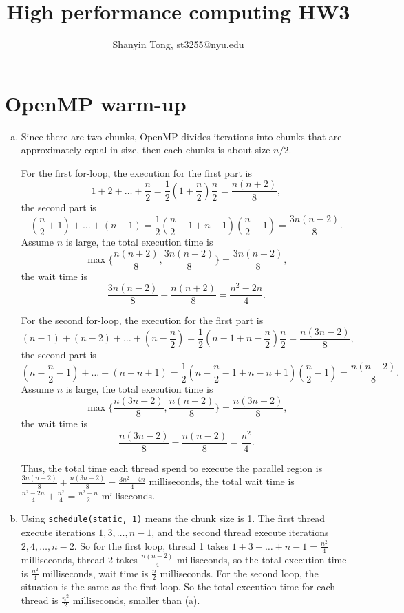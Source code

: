\documentclass[10pt,a4paper]{article}
\theoremstyle{dotlessP}
\begin{document}
\title{High performance computing HW3}
\author{Shanyin Tong, st3255@nyu.edu}

\maketitle

\section{OpenMP warm-up}
\begin{enumerate}[(a)]
	\item Since there are two chunks,  OpenMP divides iterations into chunks that are approximately equal in size, then each chunks is about size $n/2$. 
	
	For the first for-loop,  the execution for the first part is $$1+2+\ldots+\frac{n}{2}=\frac{1}{2}(1+\frac{n}{2})\frac{n}{2}=\frac{n(n+2)}{8},$$ the second part is 
	$$ (\frac{n}{2}+1) + \ldots + (n-1) = \frac{1}{2}( \frac{n}{2}+1+n-1)(\frac{n}{2}-1)=\frac{3n(n-2)}{8}.$$ Assume $n$ is large, the total execution time is 
	$$\max\{\frac{n(n+2)}{8}, \frac{3n(n-2)}{8}\}=  \frac{3n(n-2)}{8},$$ the wait time is $$\frac{3n(n-2)}{8} - \frac{n(n+2)}{8} = \frac{n^2-2n}{4} .$$
	
	For the second for-loop, the execution for the first part is $$(n-1)+(n-2)+\ldots+(n-\frac{n}{2})=\frac{1}{2}(n-1+n-\frac{n}{2})\frac{n}{2}=\frac{n(3n-2)}{8},$$ the second part is 
	$$ (n-\frac{n}{2}-1 )+ \ldots +(n- n+1) = \frac{1}{2}( n-\frac{n}{2}-1+n-n+1)(\frac{n}{2}-1)=\frac{n(n-2)}{8}.$$ Assume $n$ is large, the total execution time is 
	$$\max\{\frac{n(3n-2)}{8}, \frac{n(n-2)}{8}\}=  \frac{n(3n-2)}{8},$$ the wait time is $$\frac{n(3n-2)}{8} - \frac{n(n-2)}{8} = \frac{n^2}{4} .$$
	
	Thus, the total time each thread spend to execute the parallel region is $\frac{3n(n-2)}{8}+\frac{n(3n-2)}{8}=\frac{3n^2-4n}{4}$ milliseconds, the total wait time is $\frac{n^2-2n}{4}+\frac{n^2}{4}=\frac{n^2-n}{2}$ milliseconds.
	
	
	\item Using \texttt{schedule(static, 1)} means the chunk size is 1. The first thread execute iterations $1, 3, \ldots, n-1$, and the second thread execute iterations $2, 4, \ldots, n-2$. So for the first loop, thread 1 takes $1+3+\ldots+n-1=\frac{n^2}{4}$ milliseconds, thread 2 takes $\frac{n(n-2)}{4}$ milliseconds, so the total execution time is $\frac{n^2}{4}$ milliseconds, wait time is $\frac{n}{2}$ milliseconds. For the second loop, the situation is the same as the first loop. So the total execution time for each thread is $\frac{n^2}{2}$ milliseconds, smaller than (a). 
	

\end{enumerate}
\end{document}
